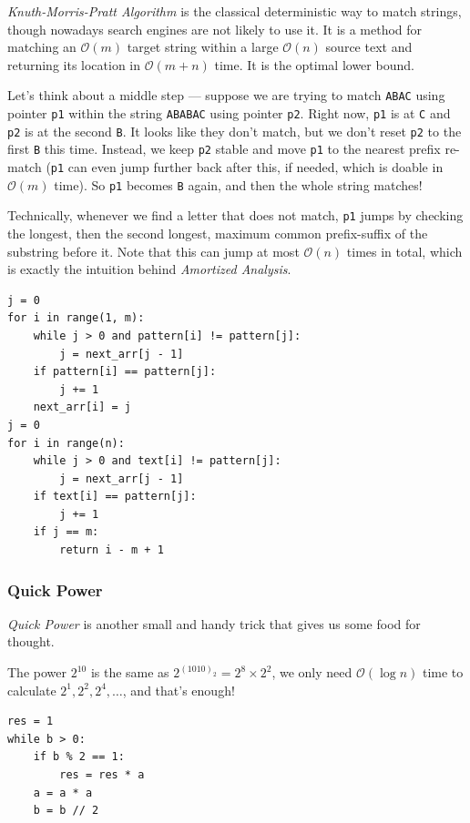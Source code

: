 \documentclass{article}
\begin{document}
\emph{Knuth-Morris-Pratt Algorithm} is the classical deterministic way to match strings, though nowadays search engines are not likely to use it. It is a method for matching an $\mathcal O(m)$ target string within a large $\mathcal O(n)$ source text and returning its location in $\mathcal O(m+n)$ time. It is the optimal lower bound.

Let's think about a middle step --- suppose we are trying to match \texttt{ABAC} using pointer \texttt{p1} within the string \texttt{ABABAC} using pointer \texttt{p2}. Right now, \texttt{p1} is at \texttt{C} and \texttt{p2} is at the second \texttt{B}. It looks like they don't match, but we don't reset \texttt{p2} to the first \texttt{B} this time. Instead, we keep \texttt{p2} stable and move \texttt{p1} to the nearest prefix re-match (\texttt{p1} can even jump further back after this, if needed, which is doable in $\mathcal{O}(m)$ time). So \texttt{p1} becomes \texttt{B} again, and then the whole string matches!

Technically, whenever we find a letter that does not match, \texttt{p1} jumps by checking the longest, then the second longest, maximum common prefix-suffix of the substring before it. Note that this can jump at most $\mathcal O(n)$ times in total, which is exactly the intuition behind \emph{Amortized Analysis}.

\begin{lstlisting}[style=python]
j = 0
for i in range(1, m):
    while j > 0 and pattern[i] != pattern[j]:
        j = next_arr[j - 1]
    if pattern[i] == pattern[j]:
        j += 1
    next_arr[i] = j
j = 0
for i in range(n):
    while j > 0 and text[i] != pattern[j]:
        j = next_arr[j - 1]
    if text[i] == pattern[j]:
        j += 1
    if j == m:
        return i - m + 1
\end{lstlisting}


\subsubsection{Quick Power}

\emph{Quick Power} is another small and handy trick that gives us some food for thought.

The power $2^{10}$ is the same as $2^{(1010)_2} = 2^8 \times 2^2$, we only need $\mathcal O(\log n)$ time to calculate $2^1, 2^2, 2^4, \dots$, and that's enough!

\begin{lstlisting}[style=python]
res = 1
while b > 0:
    if b % 2 == 1:
        res = res * a
    a = a * a
    b = b // 2
\end{lstlisting}
\end{document}
